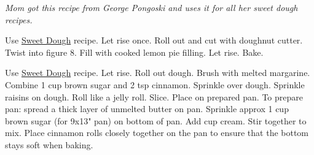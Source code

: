 \begin{minipage}{\linewidth}
\end{minipage}\par\begin{minipage}{\linewidth} 
\textit{Mom got this recipe from George Pongoski and uses it for all her sweet dough recipes.}\\

\end{minipage}\par\begin{minipage}{\linewidth} 
Use \hyperlink{sweetdoughlink}{Sweet Dough} recipe. Let rise once. Roll out and cut with doughnut cutter. Twist into figure 8. Fill with cooked lemon pie filling. Let rise. Bake.

\end{minipage}\par\begin{minipage}{\linewidth} 
Use \hyperlink{sweetdoughlink}{Sweet Dough} recipe. Let rise. Roll out dough. Brush with melted margarine. Combine 1 cup brown sugar and 2 tsp cinnamon. Sprinkle over dough. Sprinkle raisins on dough. Roll like a jelly roll. Slice. Place on prepared pan.
To prepare pan:  spread a thick layer of unmelted butter on pan. Sprinkle approx 1 cup brown sugar (for 9x13" pan) on bottom of pan. Add  cup cream. Stir together to mix.
Place cinnamon rolls closely together on the pan to ensure that the bottom stays soft when baking.


\end{minipage}
